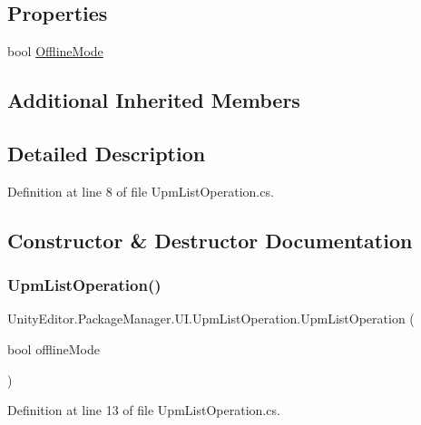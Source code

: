 \subsection*{Properties}
\begin{DoxyCompactItemize}
\item 
bool \mbox{\hyperlink{class_unity_editor_1_1_package_manager_1_1_u_i_1_1_upm_list_operation_a68c64342288c2f07fd403e91ad6cc6e7}{Offline\+Mode}}
\end{DoxyCompactItemize}
\subsection*{Additional Inherited Members}


\subsection{Detailed Description}


Definition at line 8 of file Upm\+List\+Operation.\+cs.



\subsection{Constructor \& Destructor Documentation}
\mbox{\label{class_unity_editor_1_1_package_manager_1_1_u_i_1_1_upm_list_operation_ad32ec291d1522c46987ea8f25bbe30bc}} 
\subsubsection{\texorpdfstring{UpmListOperation()}{UpmListOperation()}}
{\footnotesize\ttfamily Unity\+Editor.\+Package\+Manager.\+U\+I.\+Upm\+List\+Operation.\+Upm\+List\+Operation (\begin{DoxyParamCaption}\item[{bool}]{offline\+Mode }\end{DoxyParamCaption})}



Definition at line 13 of file Upm\+List\+Operation.\+cs.



